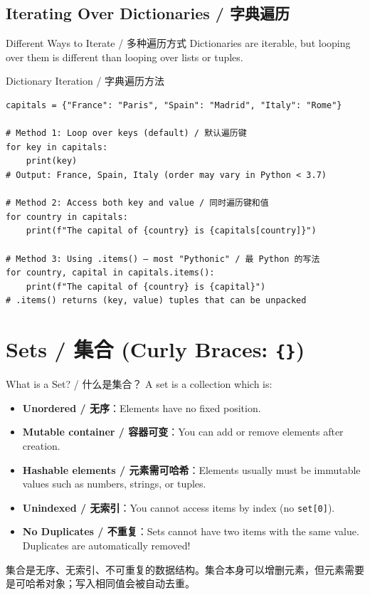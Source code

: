 \documentclass[11pt,a4paper]{report}
\let\oldtexttt\texttt
\renewcommand{\texttt}[1]{\textcolor{mainblue}{\oldtexttt{#1}}}
\begin{document}
\subsection{Iterating Over Dictionaries / 字典遍历}

\begin{concept}{Different Ways to Iterate / 多种遍历方式}
    Dictionaries are iterable, but looping over them is different than looping over lists or tuples.
\end{concept}

\begin{examplebox}{Dictionary Iteration / 字典遍历方法}
\begin{lstlisting}
capitals = {"France": "Paris", "Spain": "Madrid", "Italy": "Rome"}

# Method 1: Loop over keys (default) / 默认遍历键
for key in capitals:
    print(key)
# Output: France, Spain, Italy (order may vary in Python < 3.7)

# Method 2: Access both key and value / 同时遍历键和值
for country in capitals:
    print(f"The capital of {country} is {capitals[country]}")

# Method 3: Using .items() — most "Pythonic" / 最 Python 的写法
for country, capital in capitals.items():
    print(f"The capital of {country} is {capital}")
# .items() returns (key, value) tuples that can be unpacked
\end{lstlisting}
\end{examplebox}

\section{Sets / 集合 (Curly Braces: \texttt{\{\}})}

\begin{concept}{What is a Set? / 什么是集合？}
    A set is a collection which is:
    \begin{itemize}[itemsep=0.3em]
        \item \textbf{Unordered / 无序}：Elements have no fixed position.
        \item \textbf{Mutable container / 容器可变}：You can add or remove elements after creation.
        \item \textbf{Hashable elements / 元素需可哈希}：Elements usually must be immutable values such as numbers, strings, or tuples.
        \item \textbf{Unindexed / 无索引}：You cannot access items by index (no \texttt{set[0]}).
        \item \textbf{No Duplicates / 不重复}：Sets cannot have two items with the same value. Duplicates are automatically removed!
    \end{itemize}
    集合是无序、无索引、不可重复的数据结构。集合本身可以增删元素，但元素需要是可哈希对象；写入相同值会被自动去重。
\end{concept}
\end{document}
